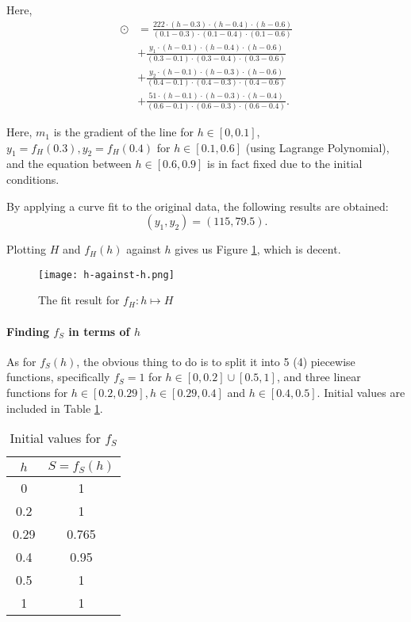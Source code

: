 Here,
\begin{align*}
    \odot & = \frac{222 \cdot (h - 0.3) \cdot (h - 0.4) \cdot (h - 0.6)}{(0.1 - 0.3) \cdot (0.1 - 0.4) \cdot (0.1 - 0.6)} \\
          & + \frac{y_1 \cdot (h - 0.1) \cdot (h - 0.4) \cdot (h - 0.6)}{(0.3 - 0.1) \cdot (0.3 - 0.4) \cdot (0.3 - 0.6)} \\
          & + \frac{y_2 \cdot (h - 0.1) \cdot (h - 0.3) \cdot (h - 0.6)}{(0.4 - 0.1) \cdot (0.4 - 0.3) \cdot (0.4 - 0.6)} \\
          & + \frac{51 \cdot (h - 0.1) \cdot (h - 0.3) \cdot (h - 0.4)}{(0.6 - 0.1) \cdot (0.6 - 0.3) \cdot (0.6 - 0.4)}.
\end{align*}

Here, \(m_1\) is the gradient of the line for \(h \in [0, 0.1]\), \(y_1 = f_H(0.3), y_2 = f_H(0.4)\) for \(h \in [0.1, 0.6]\) (using Lagrange Polynomial), and the equation between \(h \in [0.6, 0.9]\) is in fact fixed due to the initial conditions.

By applying a curve fit to the original data, the following results are obtained:
\[
    (y_1, y_2) = (115, 79.5).
\]

Plotting \(H\) and \(f_H(h)\) against \(h\) gives us Figure \ref{fig:h-against-h}, which is decent.

\begin{figure}[htp]
    \centering
    \texttt{[image: h-against-h.png]}
    \caption{The fit result for \(f_H: h \mapsto H\)}
    \label{fig:h-against-h}
\end{figure}

\paragraph{Finding \(f_S\) in terms of \(h\)}

As for \(f_S(h)\), the obvious thing to do is to split it into 5 (4) piecewise functions, specifically \(f_S = 1\) for \(h \in [0, 0.2] \cup [0.5, 1]\), and three linear functions for \(h \in [0.2, 0.29], h \in [0.29, 0.4]\) and \(h \in [0.4, 0.5]\). Initial values are included in Table \ref{tab:s-against-h-iv}.

\begin{table}[htp]
    \centering

    \begin{tabular}{|c|c|}
        \hline
        \(h\) & \(S = f_S(h)\) \\
        \hline
        0     & 1              \\
        0.2   & 1              \\
        0.29  & 0.765          \\
        0.4   & 0.95           \\
        0.5   & 1              \\
        1     & 1              \\
        \hline
    \end{tabular}
    \caption{Initial values for \(f_S\)}
    \label{tab:s-against-h-iv}
\end{table}

